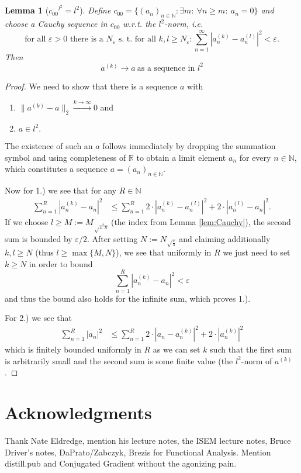\documentclass{scrartcl}
\newtheorem{lemma}{Lemma}
\theoremstyle{definition}
\theoremstyle{remark}
\newcommand{\eps}{\varepsilon}
\newcommand{\N}{\mathbb N}
\newcommand{\R}{\mathbb R}
\begin{document}
\begin{lemma}[$\overline{c_{00}}^{l^2} = l^2$]\label{lem:c00l2}
Define $c_{00} = \{(a_n)_{n\in\N}: \exists m:~ \forall n\geq m:~ a_n = 0\}$ and choose a Cauchy sequence in $c_{00}$ w.r.t. the $l^2$-norm, i.e.
\[\text{for all } \eps > 0 \text{ there is a } N_\eps \text{ s. t. for all } k,l\geq N_\eps: \sum_{n=1}^\infty |a_n^{(k)} - a_n^{(l)}|^2 < \eps.\]
Then \[a^{(k)} \to a ~ \text{as a sequence in $l^2$}\]
\end{lemma}
\begin{proof}
We need to show that there is a sequence $a$ with
\begin{enumerate}
\item $\|a^{(k)} - a\|_2 \xrightarrow{k\to\infty} 0$ and
\item $a \in l^2.$
\end{enumerate}
The existence of such an $a$ follows immediately by dropping the summation symbol and using completeness of $\R$ to obtain a limit element $a_n$ for every $n\in \N$, which constitutes a sequence $a = (a_n)_{n\in\N}$.

Now for 1.) we see that for any $R\in\N$
\begin{align*}
\sum_{n=1}^R |a_n^{(k)}-a_n|^2 &\leq  \sum_{n=1}^R 2\cdot |a_n^{(k)}-a_n^{(l)}|^2 + 2\cdot |a_n^{(l)}-a_n|^2.
\end{align*}
If we choose $l \geq M := M_{\sqrt\frac{\eps}{4\cdot R}}$ (the index from Lemma \ref{lem:Cauchy}), the second sum is bounded by $\eps/2$. After setting $N := N_{\sqrt{\frac{\eps}{4}}}$ and claiming additionally $k,l\geq N$ (thus $l\geq\max\{M,N\}$), we see that uniformly in $R$ we just need to set $k \geq N$ in order to bound 
\[\sum_{n=1}^R |a_n^{(k)}-a_n|^2  < \eps \]
and thus the bound also holds for the infinite sum, which proves 1.).

For 2.) we see that 
\begin{align*}
\sum_{n=1}^R |a_n|^2 &\leq \sum_{n=1}^R 2 \cdot|a_n-a_n^{(k)}|^2 + 2\cdot | a_n^{(k)}|^2
\end{align*}
which is finitely bounded uniformly in $R$ as we can set $k$ such that the first sum is arbitrarily small and the second sum is some finite value (the $l^2$-norm of $a^{(k)}$.
\end{proof}
\section{Acknowledgments}
Thank Nate Eldredge, mention his lecture notes, the ISEM lecture notes, Bruce Driver's notes, DaPrato/Zabczyk, Brezis for Functional Analysis. Mention distill.pub and Conjugated Gradient without the agonizing pain.


\end{document}
